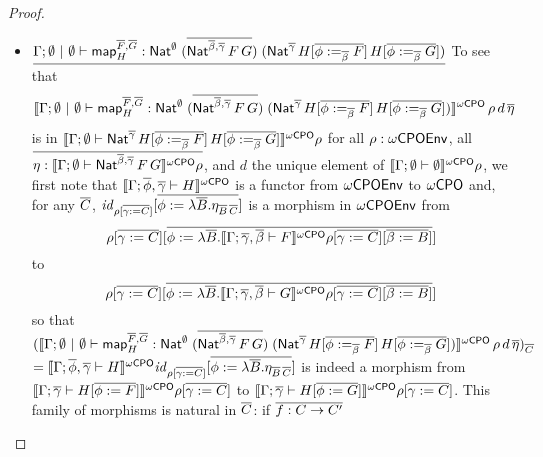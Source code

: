 \documentclass[acmsmall,review,anonymous]{acmart}
\theoremstyle{definition}
\renewcommand{\id}{\mathit{id}}
\newcommand{\map}{\mathsf{map}}
\begin{document}
\begin{proof}
\begin{itemize}

\item 
  $\underline{\Gamma;\emptyset~|~\emptyset \vdash
  \map^{\ol{F},\ol{G}}_H :
  \Nat^\emptyset\;(\ol{\Nat^{\ol{\beta},\ol{\gamma}}\,F\,G})\;
  (\Nat^{\ol{\gamma}}\,H[\ol{\phi :=_{\ol{\beta}} F}]\,H[\ol{\phi
      :=_{\ol{\beta}} G}])}$\;
To see that
\[
\oCPOsem{\Gamma; \emptyset~|~\emptyset \vdash \map^{\ol{F},\ol{G}}_H
    : \Nat^\emptyset\;(\ol{\Nat^{\ol{\beta},\ol{\gamma}}\,F\,G})\;
    (\Nat^{\ol{\gamma}}\,H[\ol{\phi :=_{\ol{\beta}} F}]\,H[\ol{\phi
        :=_{\ol{\beta}} G}])}\,\rho\,d\, \ol{\eta}
\]
is in $\llbracket{\Gamma; \emptyset \vdash
    \mathsf{Nat}^{\overline{\gamma}}\,H[\overline{\phi :=_{\overline{\beta}} F}]\,H[\overline{\phi
        :=_{\overline{\beta}} G}]}\rrbracket^{{\omega\mathsf{CPO}}} \rho$
for all $\rho : \omega\mathsf{CPOEnv}$, all $\overline{\eta : \llbracket{\Gamma; \emptyset
  \vdash\mathsf{Nat}^{\overline{\beta},\overline{\gamma}}\,F\,G}\rrbracket^{{\omega\mathsf{CPO}}} \rho}$,
  and $d$ the unique element of $\llbracket{\Gamma;\emptyset \vdash \emptyset}\rrbracket^{{\omega\mathsf{CPO}}} \rho$,
  we first note that
$\llbracket{\Gamma ;\overline{\phi}, \overline{\gamma} \vdash H}\rrbracket^{{\omega\mathsf{CPO}}}$ is a functor from
  $\omega\mathsf{CPOEnv}$ to ${\omega\mathsf{CPO}}$ and, for any $\overline{C}$, $\id_{\rho[\ol{\gamma :=
        C}]}[\ol{\phi := \lambda \ol{B}. \eta_{\ol{B}\,\ol{C}}}]$ is a
  morphism in $\omega\mathsf{CPOEnv}$ from \[\rho[\overline{\gamma := C}][\overline{\phi :=
      \lambda \overline{B}.\llbracket{\Gamma; \overline{\gamma},\overline{\beta} \vdash
        F}\rrbracket^{{\omega\mathsf{CPO}}}\rho[\overline{\gamma := C}][\overline{\beta := B}]}]\] to
\[\rho[\overline{\gamma := C}][\overline{\phi := \lambda \overline{B}.\llbracket{\Gamma;
\overline{\gamma},\overline{\beta} \vdash G}\rrbracket^{{\omega\mathsf{CPO}}}\rho[\overline{\gamma := C}][\overline{\beta := B}]}]\]
so that
$(\oCPOsem{\Gamma; \emptyset~|~\emptyset \vdash
\map^{\ol{F},\ol{G}}_H :
\Nat^\emptyset\;(\ol{\Nat^{\ol{\beta},\ol{\gamma}}\,F\,G})\;
(\Nat^{\ol{\gamma}}\,H[\ol{\phi :=_{\ol{\beta}} F}]\,H[\ol{\phi
    :=_{\ol{\beta}} G}])}\,\rho\,d\, \ol{\eta})_{\ol{C}}$
$=  \oCPOsem{\Gamma; \ol{\phi},\ol{\gamma} \vdash H}\id_{\rho[\ol{\gamma
      := C}]}[\ol{\phi := \lambda \ol{B}. \eta_{\ol{B}\,\ol{C}}}]$
is indeed a morphism from
$\llbracket{\Gamma ;\overline{\gamma} \vdash H[\overline{\phi := F}]}\rrbracket^{{\omega\mathsf{CPO}}}\rho[\overline{\gamma
      := C}]$
to 
$ \llbracket{\Gamma ;\overline{\gamma} \vdash H[\overline{\phi := G}]}\rrbracket^{{\omega\mathsf{CPO}}}\rho[\overline{\gamma
      := C}]$.
This family of morphisms is natural in $\overline{C}$: if $\overline{f : C \to C'}$

\end{itemize}
\end{proof}
\end{document}
